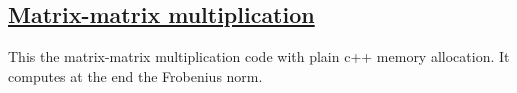 \documentclass[%
oneside,                 %
final,                   %
10pt]{article}
\begin{document}
\subsection*{\href{{https://github.com/CompPhysics/ComputationalPhysicsMSU/blob/master/doc/Programs/LecturePrograms/programs/Classes/cpp/program9.cpp}}{Matrix-matrix multiplication}}
This the matrix-matrix multiplication code with plain c++ memory allocation. It computes at the end the Frobenius norm.
\end{document}
